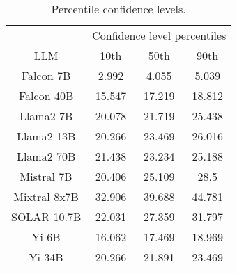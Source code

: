 \begin{table*}
\centering
\begin{tabular}{c|c|c|c}
& \multicolumn{3}{c}{Confidence level percentiles} \\ 
LLM & 10th & 50th & 90th\\ \hline
Falcon 7B & 2.992 & 4.055 & 5.039\\
Falcon 40B & 15.547 & 17.219 & 18.812\\
Llama2 7B & 20.078 & 21.719 & 25.438\\
Llama2 13B & 20.266 & 23.469 & 26.016\\
Llama2 70B & 21.438 & 23.234 & 25.188\\
Mistral 7B & 20.406 & 25.109 & 28.5\\
Mixtral 8x7B & 32.906 & 39.688 & 44.781\\
SOLAR 10.7B & 22.031 & 27.359 & 31.797\\
Yi 6B & 16.062 & 17.469 & 18.969\\
Yi 34B & 20.266 & 21.891 & 23.469\\
\hline
\end{tabular}
\caption{Percentile confidence levels.}
\label{tab:percentile_conf}
\end{table*}

